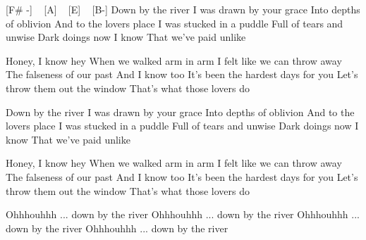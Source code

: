 

\begin{guitar}

[F# -] ~ [A] ~ [E] ~ [B-]
Down by the river
I was drawn by your grace
Into depths of oblivion
And to the lovers place
I was stucked in a puddle
Full of tears and unwise
Dark doings now I know
That we've paid unlike

Honey, I know hey
When we walked arm in arm
I felt like we can throw away
The falseness of our past
And I know too
It's been the hardest days for you
Let's throw them out the window
That's what those lovers do

Down by the river
I was drawn by your grace
Into depths of oblivion
And to the lovers place
I was stucked in a puddle
Full of tears and unwise
Dark doings now I know
That we've paid unlike

Honey, I know hey
When we walked arm in arm
I felt like we can throw away
The falseness of our past
And I know too
It's been the hardest days for you
Let's throw them out the window
That's what those lovers do

Ohhhouhhh ... down by the river
Ohhhouhhh ... down by the river
Ohhhouhhh ... down by the river
Ohhhouhhh ... down by the river 

\end{guitar}
